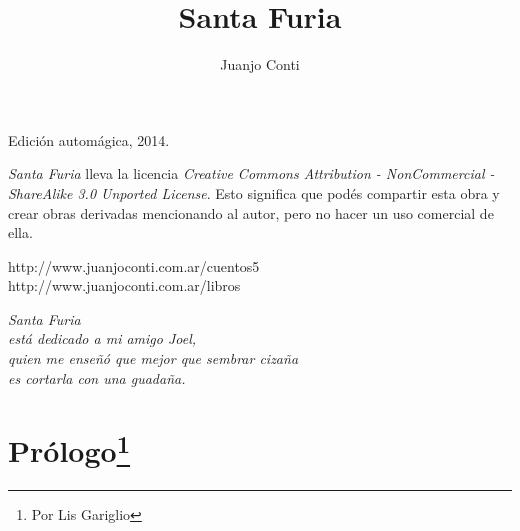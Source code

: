 \documentclass[12pt,twoside,openright,a5paper]{book}
\title{Santa Furia}
\author{Juanjo Conti}
\date{}
\begin{document}
\pagestyle{plain}

\maketitle


\thispagestyle{empty}
\noindent
Edición automágica, 2014.\\

\vspace{0.5cm}

\noindent
\emph{Santa Furia} lleva la licencia 
\emph{Creative Commons Attribution - NonCommercial - ShareAlike 3.0 Unported License}.
Esto significa que podés compartir esta obra y crear obras derivadas
mencionando al autor, pero no ha\-cer un uso comercial de ella.

\vfill

\noindent
http://www.juanjoconti.com.ar/cuentos5\\

\noindent
http://www.juanjoconti.com.ar/libros

\cleardoublepage

\noindent
\begin{flushright}
\emph{
\emph{Santa Furia}\\
está dedicado a mi amigo Joel,\\
quien me enseñó que mejor que sembrar cizaña\\
es cortarla con una guadaña.
}
\end{flushright}

\cleardoublepage

\renewcommand*\contentsname{Índice}

\tableofcontents

\chapter*{Prólogo\footnote{Por Lis Gariglio}}

\end{document}
